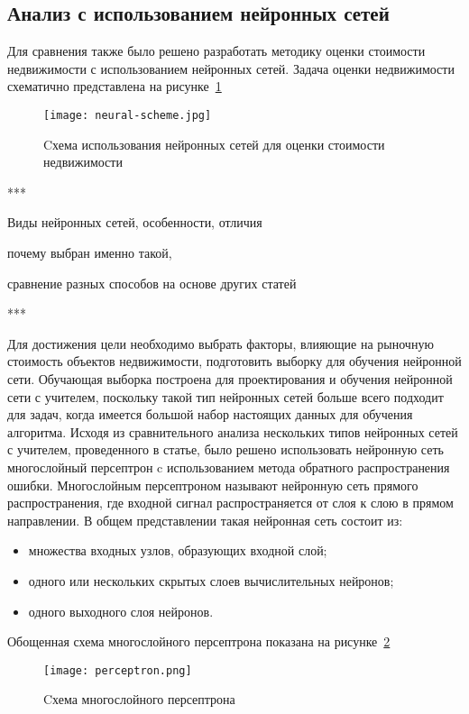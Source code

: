 \subsection{Анализ с использованием нейронных сетей}
\label{sec:experiment:neural_engines}

Для сравнения также было решено разработать методику оценки стоимости недвижимости с использованием
нейронных сетей. Задача оценки недвижимости схематично представлена на рисунке~\ref{fig:experiment:neural-scheme}

\begin{figure}[!ht]
  \centering
  \texttt{[image: neural-scheme.jpg]} 
  \caption{Cхема использования нейронных сетей для оценки стоимости недвижимости}
  \label{fig:experiment:neural-scheme}
\end{figure}

***

Виды нейронных сетей, особенности, отличия

почему выбран именно такой, 

сравнение разных способов на основе других статей

***

Для достижения цели необходимо выбрать факторы, влияющие на	рыночную стоимость объектов недвижимости, подготовить выборку для
обучения нейронной сети. Обучающая выборка построена для проектирования и обучения нейронной сети с учителем,
поскольку такой тип нейронных сетей больше всего подходит для задач, когда имеется большой набор настоящих данных для обучения
алгоритма. Исходя из сравнительного анализа нескольких типов нейронных сетей с учителем, проведенного в статье, было
решено использовать нейронную сеть многослойный персептрон c использованием метода обратного распространения ошибки.
Многослойным персептроном называют нейронную сеть прямого распространения, где входной сигнал распространяется от слоя
к слою в прямом направлении. В общем представлении такая нейронная сеть состоит из:
\begin{itemize}
  \item множества входных узлов, образующих входной слой;
  \item одного или нескольких скрытых слоев вычислительных нейронов;
  \item одного выходного слоя нейронов.
\end{itemize}

Обощенная схема многослойного персептрона показана на рисунке~\ref{fig:experiment:perceptron-scheme}
\begin{figure}[!ht]
  \centering
  \texttt{[image: perceptron.png]}
  \caption{Cхема многослойного персептрона}
  \label{fig:experiment:perceptron-scheme}
\end{figure}

